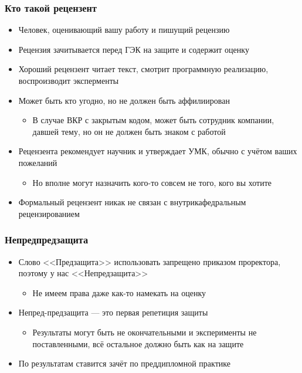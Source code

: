 \documentclass{../../slides-style}
\begin{document}
    \begin{frame}
        \frametitle{Кто такой рецензент}
        \begin{itemize}
            \item Человек, оценивающий вашу работу и пишущий рецензию
            \item Рецензия зачитывается перед ГЭК на защите и содержит оценку
            \item Хороший рецензент читает текст, смотрит программную реализацию, воспроизводит эксперменты
            \item Может быть кто угодно, но не должен быть аффилиирован
            \begin{itemize}
                \item В случае ВКР с закрытым кодом, может быть сотрудник компании, давшей тему, но он не должен быть знаком с работой
            \end{itemize}
            \item Рецензента рекомендует научник и утверждает УМК, обычно с учётом ваших пожеланий
            \begin{itemize}
                \item Но вполне могут назначить кого-то совсем не того, кого вы хотите
            \end{itemize}
            \item Формальный рецензент никак не связан с внутрикафедральным рецензированием
        \end{itemize}
    \end{frame}

    \begin{frame}
        \frametitle{Непредпредзащита}
        \begin{itemize}
            \item Слово <<Предзащита>> использовать запрещено приказом проректора, поэтому у нас <<Непредзащита>>
            \begin{itemize}
                \item Не имеем права даже как-то намекать на оценку
            \end{itemize}
            \item Непред-предзащита --- это первая репетиция защиты
            \begin{itemize}
                \item Результаты могут быть не окончательными и эксперименты не поставленными, всё остальное должно быть как на защите
            \end{itemize}
            \item По результатам ставится зачёт по преддипломной практике
        \end{itemize}
    \end{frame}
\end{document}
